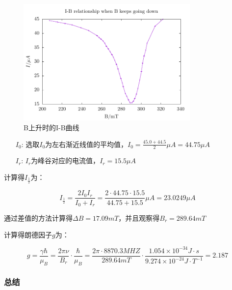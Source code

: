 \documentclass[a4paper,UTF8]{ctexart}
\begin{document}
\begin{figure}[H]
    \centering
    \begin{minipage}[b]{0.9\textwidth}
        \centering
        \includegraphics[width=0.8\textwidth]{./f2.pdf}
        \caption{B上升时的I-B曲线}
    \end{minipage}
\end{figure}

\begin{enumerate}
    \item[$I_0$:] 选取$I_0$为左右渐近线值的平均值，$I_0 = \frac{45.0+44.5}{2}\mu A=44.75\mu A$
    \item[$I_r$:] $I_r$为峰谷对应的电流值，$I_r = 15.5\mu A$
\end{enumerate}

计算得$I_{\frac{1}{2}}$为：

\begin{equation}
    I_{\frac{1}{2}} = \frac{2 I_0 I_{r}}{I_0 + I_{r}} = \frac{2 \cdot 44.75 \cdot 15.5}{44.75+15.5}\mu A = 23.0249 \mu A
\end{equation}

通过差值的方法计算得$\Delta B = 17.09 mT$，并且观察得$B_r = 289.64 mT$

计算得朗德因子$g$为：

\begin{equation}
    g = \frac{\gamma \hbar}{\mu_B} = \frac{2\pi \nu}{B_r} \cdot \frac{\hbar}{\mu_B} = \frac{2\pi \cdot 8870.3 MHZ}{289.64 mT} \cdot \frac{1.054 \times 10^{-34}J\cdot s}{9.274 \times 10^{-24} J\cdot T^{-1}} = 2.187
\end{equation}

\subsubsection{总结}
\end{document}
